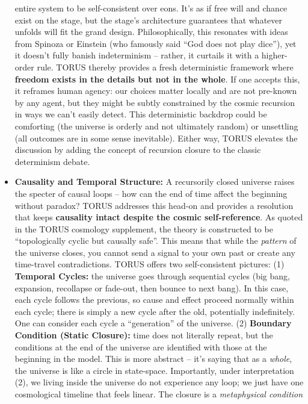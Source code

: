 \documentclass[]{article}
\begin{document}
\begin{itemize}
  entire system to be self-consistent over eons​. It's as if free will
  and chance exist on the stage, but the stage's architecture guarantees
  that whatever unfolds will fit the grand design. Philosophically, this
  resonates with ideas from Spinoza or Einstein (who famously said ``God
  does not play dice''), yet it doesn't fully banish indeterminism --
  rather, it curtails it with a higher-order rule. TORUS thereby
  provides a fresh deterministic framework where \textbf{freedom exists
  in the details but not in the whole}. If one accepts this, it reframes
  human agency: our choices matter locally and are not pre-known by any
  agent, but they might be subtly constrained by the cosmic recursion in
  ways we can't easily detect. This deterministic backdrop could be
  comforting (the universe is orderly and not ultimately random) or
  unsettling (all outcomes are in some sense inevitable). Either way,
  TORUS elevates the discussion by adding the concept of recursion
  closure to the classic determinism debate.
\item
  \textbf{Causality and Temporal Structure:} A recursorily closed
  universe raises the specter of causal loops -- how can the end of time
  affect the beginning without paradox? TORUS addresses this head-on and
  provides a resolution that keeps \textbf{causality intact despite the
  cosmic self-reference}. As quoted in the TORUS cosmology supplement,
  the theory is constructed to be ``topologically cyclic but causally
  safe''​. This means that while the \emph{pattern} of the universe
  closes, you cannot send a signal to your own past or create any
  time-travel contradictions. TORUS offers two self-consistent pictures:
  (1) \textbf{Temporal Cycles:} the universe goes through sequential
  cycles (big bang, expansion, recollapse or fade-out, then bounce to
  next bang)​. In this case, each cycle follows the previous, so cause
  and effect proceed normally within each cycle; there is simply a new
  cycle after the old, potentially indefinitely. One can consider each
  cycle a ``generation'' of the universe. (2) \textbf{Boundary Condition
  (Static Closure):} time does not literally repeat, but the conditions
  at the end of the universe are identified with those at the beginning
  in the model​. This is more abstract -- it's saying that as a
  \emph{whole}, the universe is like a circle in state-space.
  Importantly, under interpretation (2), we living inside the universe
  do not experience any loop; we just have one cosmological timeline
  that feels linear. The closure is a \emph{metaphysical condition}

\end{itemize}
\end{document}
